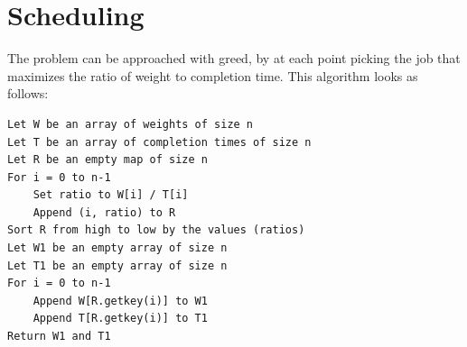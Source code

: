 \documentclass[12pt]{article}
\begin{document}
\maketitle

\section{Scheduling}\label{scheduling}
\begin{addmargin}[2em]{2em}
The problem can be approached with greed, by at each point picking the job that maximizes the ratio of weight to completion time. This algorithm looks as follows:
\begin{lstlisting}
Let W be an array of weights of size n
Let T be an array of completion times of size n
Let R be an empty map of size n
For i = 0 to n-1
    Set ratio to W[i] / T[i]
    Append (i, ratio) to R
Sort R from high to low by the values (ratios)
Let W1 be an empty array of size n
Let T1 be an empty array of size n
For i = 0 to n-1
    Append W[R.getkey(i)] to W1
    Append T[R.getkey(i)] to T1
Return W1 and T1
\end{lstlisting}
\end{addmargin}
\end{document}
